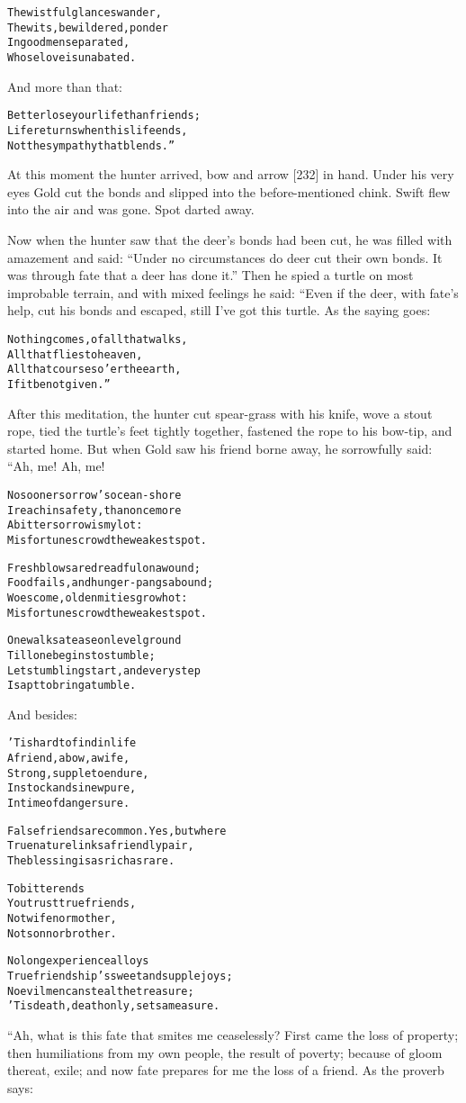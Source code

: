 \documentclass{article}
\renewenvironment{verbatim}{\begin{alltt}\normalfont\begin{centering}}{\end{centering}\end{alltt}}
\begin{document}
\begin{verbatim}
The wistful glances wander,
The wits, bewildered, ponder
In good men separated,
Whose love is unabated.
\end{verbatim}
And more than that:

\begin{verbatim}
Better lose your life than friends;
Life returns when this life ends,
Not the sympathy that blends.”
\end{verbatim}
At this moment the hunter arrived, bow and arrow [232] in hand.
Under his very eyes Gold cut the bonds and slipped into the
before-mentioned chink. Swift flew into the air and was gone. Spot
darted away.

Now when the hunter saw that the deer's bonds had been cut, he was
filled with amazement and said:
``Under no circumstances do deer cut their own bonds. It was through fate that a deer has done it.''
Then he spied a turtle on most improbable terrain, and with mixed
feelings he said: “Even if the deer, with fate's help, cut his
bonds and escaped, still I've got this turtle. As the saying goes:

\begin{verbatim}
Nothing comes, of all that walks,
    All that flies to heaven,
All that courses o'er the earth,
    If it be not given.”
\end{verbatim}
After this meditation, the hunter cut spear-grass with his knife,
wove a stout rope, tied the turtle's feet tightly together,
fastened the rope to his bow-tip, and started home. But when Gold
saw his friend borne away, he sorrowfully said: “Ah, me! Ah, me!

\begin{verbatim}
No sooner sorrow's ocean-shore
I reach in safety, than once more
A bitter sorrow is my lot:
Misfortunes crowd the weakest spot.

Fresh blows are dreadful on a wound;
Food fails, and hunger-pangs abound;
Woes come, old enmities grow hot:
Misfortunes crowd the weakest spot.

One walks at ease on level ground
    Till one begins to stumble;
Let stumbling start, and every step
    Is apt to bring a tumble.
\end{verbatim}
And besides:

\begin{verbatim}
'Tis hard to find in life
A friend, a bow, a wife,
Strong, supple to endure,
In stock and sinew pure,
In time of danger sure.

False friends are common. Yes, but where
True nature links a friendly pair,
The blessing is as rich as rare.

To bitter ends
You trust true friends,
Not wife nor mother,
Not son nor brother.

No long experience alloys
True friendship's sweet and supple joys;
No evil men can steal the treasure;
'Tis death, death only, sets a measure.
\end{verbatim}
“Ah, what is this fate that smites me ceaselessly? First came the
loss of property; then humiliations from my own people, the result
of poverty; because of gloom thereat, exile; and now fate prepares
for me the loss of a friend. As the proverb says:
\end{document}
